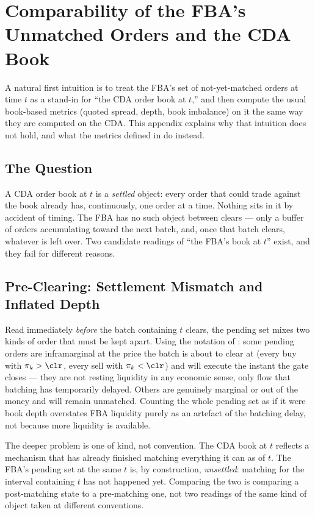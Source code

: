 \chapter{Comparability of the FBA's Unmatched Orders and the CDA Book}
\label{app:comparability}

A natural first intuition is to treat the FBA's set of not-yet-matched
orders at time $t$ as a stand-in for ``the CDA order book at $t$,'' and
then compute the usual book-based metrics (quoted spread, depth, book
imbalance) on it the same way they are computed on the CDA. This appendix
explains why that intuition does not hold, and what the
metrics defined in  do instead.

\section{The Question}

A CDA order book at $t$ is a \emph{settled} object: every order that could
trade against the book already has, continuously, one order at a time.
Nothing sits in it by accident of timing. The FBA has no such object
between clears --- only a buffer of orders accumulating toward the next
batch, and, once that batch clears, whatever is left over. Two candidate
readings of ``the FBA's book at $t$'' exist, and they fail for different
reasons.

\section{Pre-Clearing: Settlement Mismatch and Inflated Depth}

Read immediately \emph{before} the batch containing $t$ clears, the
pending set mixes two kinds of order that must be kept apart. Using the notation
of : some pending orders are inframarginal at the
price the batch is about to clear at (every buy with $\pi_k > \clr$,
every sell with $\pi_k < \clr$) and will execute the instant the gate
closes --- they are not resting liquidity in any economic sense, only
flow that batching has temporarily delayed. Others are genuinely
marginal or out of the money and will remain unmatched. Counting the
whole pending set as if it were book depth overstates FBA liquidity
purely as an artefact of the batching delay, not because more liquidity
is available.

The deeper problem is one of kind, not convention. The CDA book at $t$
reflects a mechanism that has already finished matching everything it
can as of $t$. The FBA's pending set at the same $t$ is, by construction,
\emph{unsettled}: matching for the interval containing $t$ has not
happened yet. Comparing the two is comparing a post-matching state to a
pre-matching one, not two readings of the same kind of object taken at
different conventions.

